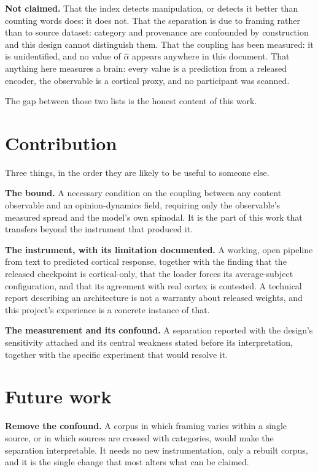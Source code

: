 \textbf{Not claimed.} That the index detects manipulation, or detects it better than
counting words does: it does not. That the separation is due to
framing rather than to source dataset: category and provenance are confounded by construction
and this design cannot distinguish them. That the coupling has been measured: it is
unidentified, and no value of $\hat{\alpha}$ appears anywhere in this document. That anything
here measures a brain: every value is a prediction from a released encoder, the observable is
a cortical proxy, and no participant was scanned.

The gap between those two lists is the honest content of this work.

\section{Contribution}

Three things, in the order they are likely to be useful to someone else.

\textbf{The bound.} A necessary condition on the coupling between any content observable and
an opinion-dynamics field, requiring only the observable's measured spread and the model's own
spinodal. It is the part of this work that transfers beyond the instrument that produced it.

\textbf{The instrument, with its limitation documented.} A working, open pipeline from text to
predicted cortical response, together with the finding that the released checkpoint is
cortical-only, that the loader forces its average-subject configuration, and that its
agreement with real cortex is contested. A technical report describing an architecture is not
a warranty about released weights, and this project's experience is a concrete instance of
that.

\textbf{The measurement and its confound.} A separation reported with the design's
sensitivity attached and its central weakness stated before its interpretation, together with
the specific experiment that would resolve it.

\section{Future work}

\textbf{Remove the confound.} A corpus in which framing varies within a single source, or in
which sources are crossed with categories, would make the separation interpretable. It needs
no new instrumentation, only a rebuilt corpus, and it is the single change that most alters
what can be claimed.

